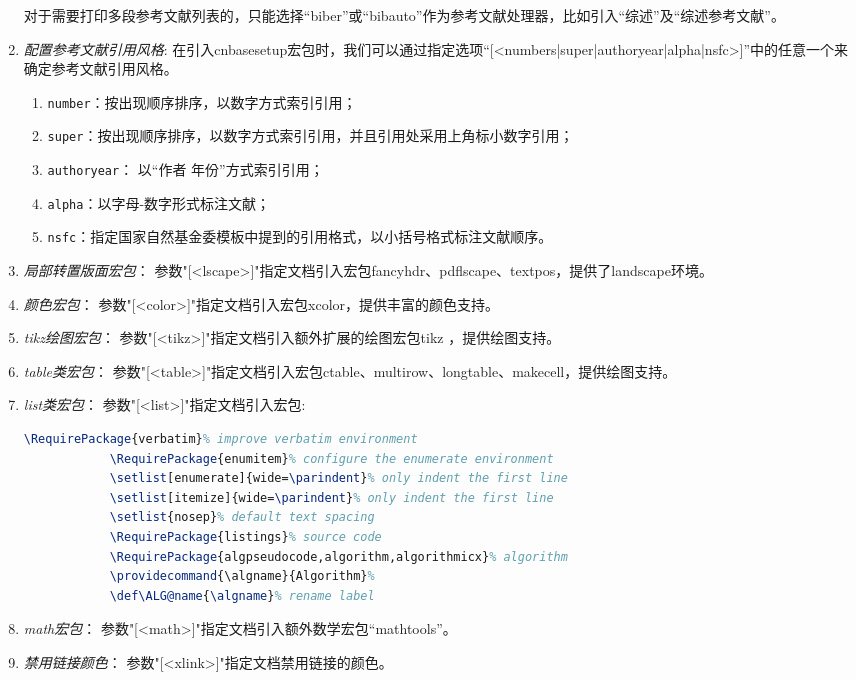 \begin{enumerate}
    对于需要打印多段参考文献列表的，只能选择“biber”或“bibauto”作为参考文献处理器，比如引入“综述”及“综述参考文献”。
    \item \emph{配置参考文献引用风格}: 在引入cnbasesetup宏包时，我们可以通过指定选项“[<numbers|super|authoryear|alpha|nsfc>]”中的任意一个来确定参考文献引用风格。
        \begin{enumerate}
        \item \verb|number|：按出现顺序排序，以数字方式索引引用；
        \item \verb|super|：按出现顺序排序，以数字方式索引引用，并且引用处采用上角标小数字引用；
        \item \verb|authoryear|： 以“作者 年份”方式索引引用；
        \item \verb|alpha|：以字母-数字形式标注文献；
        \item \verb|nsfc|：指定国家自然基金委模板中提到的引用格式，以小括号格式标注文献顺序。
        \end{enumerate}
    \item \emph{局部转置版面宏包}： 参数"[<lscape>]"指定文档引入宏包fancyhdr、pdflscape、textpos，提供了landscape环境。
    \item \emph{颜色宏包}： 参数"[<color>]"指定文档引入宏包xcolor，提供丰富的颜色支持。
    \item \emph{tikz绘图宏包}： 参数"[<tikz>]"指定文档引入额外扩展的绘图宏包tikz ，提供绘图支持。
    \item \emph{table类宏包}： 参数"[<table>]"指定文档引入宏包ctable、multirow、longtable、makecell，提供绘图支持。
    \item \emph{list类宏包}： 参数"[<list>]"指定文档引入宏包:
        \begin{lstlisting}[language=tex]
            \RequirePackage{verbatim}% improve verbatim environment
            \RequirePackage{enumitem}% configure the enumerate environment
            \setlist[enumerate]{wide=\parindent}% only indent the first line
            \setlist[itemize]{wide=\parindent}% only indent the first line
            \setlist{nosep}% default text spacing
            \RequirePackage{listings}% source code
            \RequirePackage{algpseudocode,algorithm,algorithmicx}% algorithm
            \providecommand{\algname}{Algorithm}%
            \def\ALG@name{\algname}% rename label
        \end{lstlisting}%
    \item \emph{math宏包}： 参数"[<math>]"指定文档引入额外数学宏包“mathtools”。
    \item \emph{禁用链接颜色}： 参数"[<xlink>]"指定文档禁用链接的颜色。
\end{enumerate}


